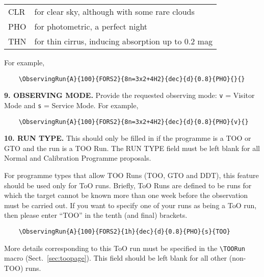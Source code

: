 \documentclass{article}
\begin{document}
\smallskip

\begin{tabular}{ll}
  CLR & for clear sky, although with some rare clouds \\
  PHO & for photometric, a perfect night \\
  THN & for thin cirrus, inducing absorption up to 0.2 mag \\
\end{tabular}

\smallskip

For example, 
\begin{verbatim}
    \ObservingRun{A}{100}{FORS2}{8n=3x2+4H2}{dec}{d}{0.8}{PHO}{}{}
\end{verbatim}

\medskip

{\bf 9.  OBSERVING MODE.} Provide the requested observing mode:
\verb|v| = Visitor Mode and \verb|s| = Service Mode. For example,
\begin{verbatim}
    \ObservingRun{A}{100}{FORS2}{8n=3x2+4H2}{dec}{d}{0.8}{PHO}{v}{}
\end{verbatim}

{\bf 10.  RUN TYPE.}
This should only be filled in if the programme is a TOO or GTO 
and the run is a TOO Run.  The RUN TYPE field must be left blank 
for all Normal and Calibration Programme proposals.

For programme types that allow TOO Runs (TOO, GTO and DDT), this feature
should be used only for ToO runs.
Briefly, ToO Runs are defined to be runs for which the target cannot be known more than
one week before the observation must be carried out.
If you want to specify one of your runs 
as being a ToO run, then please enter ``TOO'' in the tenth (and final) brackets.

\begin{verbatim}
    \ObservingRun{A}{100}{FORS2}{1h}{dec}{d}{0.8}{PHO}{s}{TOO}
\end{verbatim}

More details corresponding to this ToO run must be specified in the
\verb|\TOORun| macro (Sect.~\ref{sec:toopage}).
This field should be left blank for all other (non-TOO) runs.
\end{document}
